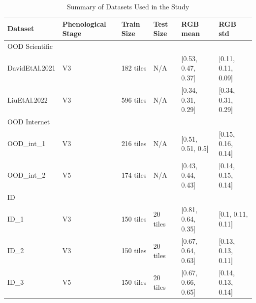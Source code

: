 \documentclass[12pt,a4paper,oneside]{report}
\begin{document}
\begin{table}[H]
\caption{Summary of Datasets Used in the Study}
\label{tab:datasets}
\centering
\begin{tabularx}{\textwidth}{lXXXXX}
\toprule
\textbf{Dataset} & \textbf{Phenological Stage} & \textbf{Train Size} & \textbf{Test Size} & \textbf{RGB mean} & \textbf{RGB std} \\
\midrule
\multicolumn{6}{l}{OOD Scientific} \\
\hspace{0.5em}DavidEtAl.2021 \cite{davidPlantDetectionCounting2021} & V3 & 182 tiles & N/A & [0.53, 0.47, 0.37] & [0.11, 0.11, 0.09] \\
\hspace{0.5em}LiuEtAl.2022 \cite{liuEstimatingMaizeSeedling2022} & V3 & 596 tiles & N/A & [0.34, 0.31, 0.29] & [0.34, 0.31, 0.29] \\
\midrule
\multicolumn{6}{l}{OOD Internet} \\
\hspace{0.5em}OOD\_int\_1 \cite{Maize_seedingDatasetOverview} & V3 & 216 tiles & N/A & [0.51, 0.51, 0.5] & [0.15, 0.16, 0.14] \\
\hspace{0.5em}OOD\_int\_2 \cite{MaizeseedlingdetectionDatasetOverview} & V5 & 174 tiles & N/A & [0.43, 0.44, 0.43] & [0.14, 0.15, 0.14] \\
\midrule
\multicolumn{6}{l}{ID} \\
\hspace{0.5em}ID\_1 & V3 & 150 tiles & 20 tiles & [0.81, 0.64, 0.35] & [0.1, 0.11, 0.11] \\
\hspace{0.5em}ID\_2 & V3 & 150 tiles & 20 tiles & [0.67, 0.64, 0.63] & [0.13, 0.13, 0.11] \\
\hspace{0.5em}ID\_3 & V5 & 150 tiles & 20 tiles & [0.67, 0.66, 0.65] & [0.14, 0.13, 0.14] \\
\bottomrule
\end{tabularx}
\end{table}
\end{document}
